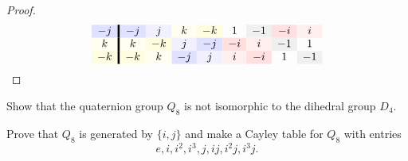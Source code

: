 \documentclass{ximera}
\begin{document}
\begin{example}
\begin{proof}
\begin{gather*}
\begin{array}{c!{\vline width 2pt}cccccccc}
      -j \cellcolor{blue!12!white}& -j \cellcolor{blue!12!white} & j \cellcolor{blue!6!white} & k \cellcolor{yellow!6!white}  & -k\cellcolor{yellow!12!white} & 1  & -1 \cellcolor{black!6!white} & -i \cellcolor{red!12!white} & i \cellcolor{red!6!white} \\
      k \cellcolor{yellow!6!white}& k \cellcolor{yellow!6!white} & -k \cellcolor{yellow!12!white} & j \cellcolor{blue!6!white}  & -j\cellcolor{blue!12!white} & -i \cellcolor{red!12!white} & i\cellcolor{red!6!white}  & -1 \cellcolor{black!6!white} & 1  \\
      -k \cellcolor{yellow!12!white}& -k \cellcolor{yellow!12!white} & k \cellcolor{yellow!6!white} & -j \cellcolor{blue!12!white}  & j\cellcolor{blue!6!white} & i \cellcolor{red!6!white} & -i\cellcolor{red!12!white}  & 1 & -1 \cellcolor{black!6!white}
    \end{array}
    \end{gather*}
  \end{proof}
\end{example}

\begin{exercise}
   Show that the quaternion group $Q_8$ is not isomorphic to the
   dihedral group $D_4$.
\end{exercise}

\begin{exercise}
  Prove that $Q_8$ is generated by $\{i, j\}$ and make a Cayley table
  for $Q_8$ with entries
  \[
  e, i, i^2, i^3, j, ij, i^2j, i^3j.
  \]
\end{exercise}
\end{document}
